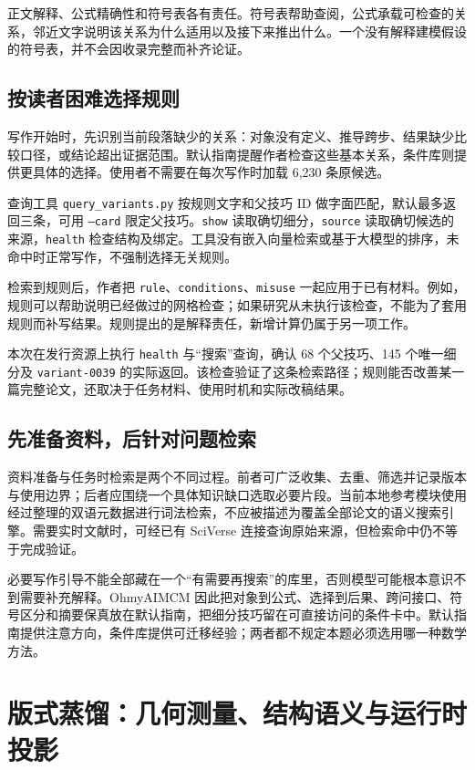\documentclass[UTF8,a4paper,zihao=-4,fontset=fandol]{ctexart}
\newcommand{\sys}{\textsf{OhmyAIMCM}}
\newcommand{\code}[1]{\texttt{\small #1}}
\begin{document}
正文解释、公式精确性和符号表各有责任。符号表帮助查阅，公式承载可检查的关系，邻近文字说明该关系为什么适用以及接下来推出什么。一个没有解释建模假设的符号表，并不会因收录完整而补齐论证。

\subsection{按读者困难选择规则}

写作开始时，先识别当前段落缺少的关系：对象没有定义、推导跨步、结果缺少比较口径，或结论超出证据范围。默认指南提醒作者检查这些基本关系，条件库则提供更具体的选择。使用者不需要在每次写作时加载 6,230 条原候选。

查询工具 \code{query\_variants.py} 按规则文字和父技巧 ID 做字面匹配，默认最多返回三条，可用 \code{--card} 限定父技巧。\code{show} 读取确切细分，\code{source} 读取确切候选的来源，\code{health} 检查结构及绑定。工具没有嵌入向量检索或基于大模型的排序，未命中时正常写作，不强制选择无关规则。

检索到规则后，作者把 \code{rule}、\code{conditions}、\code{misuse} 一起应用于已有材料。例如，规则可以帮助说明已经做过的网格检查；如果研究从未执行该检查，不能为了套用规则而补写结果。规则提出的是解释责任，新增计算仍属于另一项工作。

本次在发行资源上执行 \code{health} 与“搜索”查询，确认 68 个父技巧、145 个唯一细分及 \code{variant-0039} 的实际返回。该检查验证了这条检索路径；规则能否改善某一篇完整论文，还取决于任务材料、使用时机和实际改稿结果。

\subsection{先准备资料，后针对问题检索}

资料准备与任务时检索是两个不同过程。前者可广泛收集、去重、筛选并记录版本与使用边界；后者应围绕一个具体知识缺口选取必要片段。当前本地参考模块使用经过整理的双语元数据进行词法检索，不应被描述为覆盖全部论文的语义搜索引擎。需要实时文献时，可经已有 SciVerse 连接查询原始来源，但检索命中仍不等于完成验证。

必要写作引导不能全部藏在一个“有需要再搜索”的库里，否则模型可能根本意识不到需要补充解释。\sys{} 因此把对象到公式、选择到后果、跨问接口、符号区分和摘要保真放在默认指南，把细分技巧留在可直接访问的条件卡中。默认指南提供注意方向，条件库提供可迁移经验；两者都不规定本题必须选用哪一种数学方法。

\section{版式蒸馏：几何测量、结构语义与运行时投影}
\end{document}
